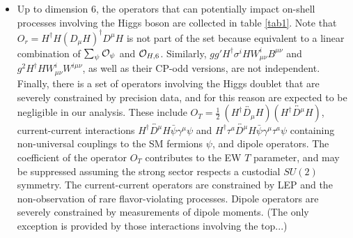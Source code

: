 \documentclass[../report.tex]{subfiles}
\begin{document}
\begin{itemize}
\item Up to dimension 6, the operators that can potentially impact on-shell processes involving the Higgs boson are collected in table \ref{tab1}. Note that ${O}_r=H^\dagger H(D_\mu H)^\dagger D^\mu H$ is not part of the set because equivalent to a linear combination of $\sum_\psi{\cal O}_\psi$ and ${\cal O}_{H,6}$. Similarly, $gg'H^\dagger\sigma^i HW^i_{\mu\nu}B^{\mu\nu}$ and $g^2H^\dagger HW^i_{\mu\nu}W^{i\mu\nu}$, as well as their CP-odd versions, are not independent. Finally, there is a set of operators involving the Higgs doublet that are severely constrained by precision data, and for this reason are expected to be negligible in our analysis. These include $O_T=\frac{1}{2}~(H^\dagger\overleftrightarrow{D_\mu}H)(H^\dagger\overleftrightarrow{D^\mu}H)$, current-current interactions $H^\dagger \overleftrightarrow{D^\mu}H \bar \psi\gamma^\mu \psi$ and $H^\dagger \tau^a\overleftrightarrow{D^\mu}H \bar \psi\gamma^\mu \tau^a\psi$ containing non-universal couplings to the SM fermions $\psi$, and dipole operators. The coefficient of the operator $O_T$ contributes to the EW $T$ parameter, and may be suppressed assuming the strong sector respects a custodial $SU(2)$ symmetry. The current-current operators are constrained by LEP and the non-observation of rare flavor-violating processes. Dipole operators are severely constrained by measurements of dipole moments. (The only exception is provided by those interactions involving the top...)




\end{itemize}
\end{document}
